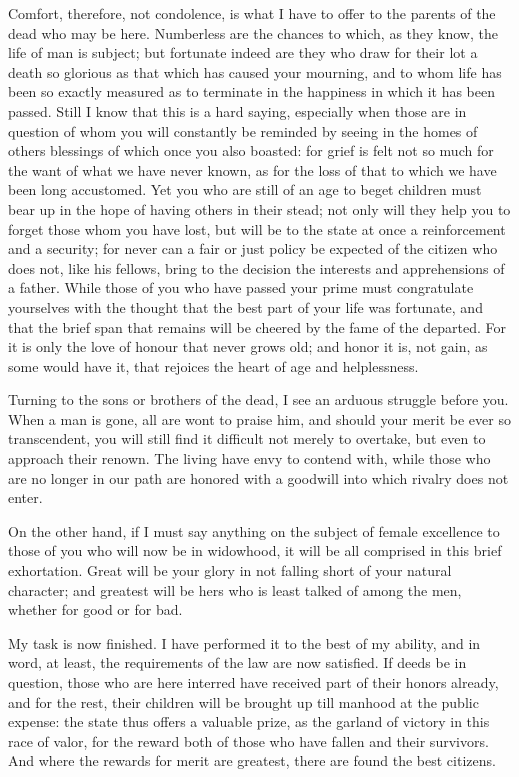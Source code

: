 \documentclass[a4paper]{amsbook}
\begin{document}
Comfort, therefore, not condolence, is what I have to offer to the parents of the dead who may be here. Numberless are the chances to which, as they know, the life of man is subject; but fortunate indeed are they who draw for their lot a death so glorious as that which has caused your mourning, and to whom life has been so exactly measured as to terminate in the happiness in which it has been passed. Still I know that this is a hard saying, especially when those are in question of whom you will constantly be reminded by seeing in the homes of others blessings of which once you also boasted: for grief is felt not so much for the want of what we have never known, as for the loss of that to which we have been long accustomed. Yet you who are still of an age to beget children must bear up in the hope of having others in their stead; not only will they help you to forget those whom you have lost, but will be to the state at once a reinforcement and a security; for never can a fair or just policy be expected of the citizen who does not, like his fellows, bring to the decision the interests and apprehensions of a father. While those of you who have passed your prime must congratulate yourselves with the thought that the best part of your life was fortunate, and that the brief span that remains will be cheered by the fame of the departed. For it is only the love of honour that never grows old; and honor it is, not gain, as some would have it, that rejoices the heart of age and helplessness.

Turning to the sons or brothers of the dead, I see an arduous struggle before you. When a man is gone, all are wont to praise him, and should your merit be ever so transcendent, you will still find it difficult not merely to overtake, but even to approach their renown. The living have envy to contend with, while those who are no longer in our path are honored with a goodwill into which rivalry does not enter.

On the other hand, if I must say anything on the subject of female excellence to those of you who will now be in widowhood, it will be all comprised in this brief exhortation. Great will be your glory in not falling short of your natural character; and greatest will be hers who is least talked of among the men, whether for good or for bad.

My task is now finished. I have performed it to the best of my ability, and in word, at least, the requirements of the law are now satisfied. If deeds be in question, those who are here interred have received part of their honors already, and for the rest, their children will be brought up till manhood at the public expense: the state thus offers a valuable prize, as the garland of victory in this race of valor, for the reward both of those who have fallen and their survivors. And where the rewards for merit are greatest, there are found the best citizens.
\end{document}
